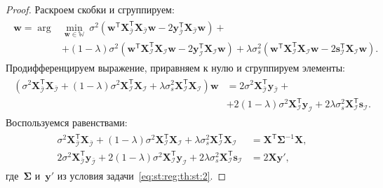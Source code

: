 \begin{proof}
Раскроем скобки и сгруппируем:
\begin{gather}
\label{eq:st:reg:3}
\begin{aligned}
\hat{\mathbf{w}} = \arg&\min_{\mathbf{w}\in \mathbb{W}} ~ \sigma^2\left(\mathbf{w}^{\mathsf{T}}\mathbf{X}^{\mathsf{T}}_{\bar{\mathcal{I}}}\mathbf{X}_{\bar{\mathcal{I}}}\mathbf{w} - 2\mathbf{y}^{\mathsf{T}}_{\bar{\mathcal{I}}}\mathbf{X}_{\bar{\mathcal{I}}}\mathbf{w}\right) +\\
&+ \left(1-\lambda\right)\sigma^2\left(\mathbf{w}^{\mathsf{T}}\mathbf{X}^{\mathsf{T}}_{\mathcal{I}}\mathbf{X}_{\mathcal{I}}\mathbf{w}- 2\mathbf{y}^{\mathsf{T}}_{\mathcal{I}}\mathbf{X}_{\mathcal{I}}\mathbf{w}\right) + \lambda\sigma^2_s\left(\mathbf{w}^{\mathsf{T}}\mathbf{X}^{\mathsf{T}}_{\mathcal{I}}\mathbf{X}_{\mathcal{I}}\mathbf{w}- 2\mathbf{s}^{\mathsf{T}}_{\mathcal{I}}\mathbf{X}_{\mathcal{I}}\mathbf{w}\right).
\end{aligned}
\end{gather}
Продифференцируем выражение, приравняем к нулю и сгруппируем элементы:
\begin{gather}
\label{eq:st:reg:4}
\begin{aligned}
\left(\sigma^{2}\mathbf{X}^{\mathsf{T}}_{\bar{\mathcal{I}}}\mathbf{X}_{\bar{\mathcal{I}}} + \left(1-\lambda\right)\sigma^2\mathbf{X}^{\mathsf{T}}_{\mathcal{I}}\mathbf{X}_{\mathcal{I}} + \lambda\sigma^{2}_s\mathbf{X}^{\mathsf{T}}_{\mathcal{I}}\mathbf{X}_{\mathcal{I}}\right) \mathbf{w}& = 2\sigma^2\mathbf{X}^{\mathsf{T}}_{\bar{\mathcal{I}}}\mathbf{y}_{\bar{\mathcal{I}}}+\\
&+ 2\left(1-\lambda\right)\sigma^2\mathbf{X}^{\mathsf{T}}_{\mathcal{I}}\mathbf{y}_{\mathcal{I}} + 2\lambda\sigma_s^2\mathbf{X}^{\mathsf{T}}_{\mathcal{I}}\mathbf{s}_{\mathcal{I}}.
\end{aligned}
\end{gather}
Воспользуемся равенствами:
\begin{gather}
\label{eq:st:reg:simp}
\begin{aligned}
\sigma^{2}\mathbf{X}^{\mathsf{T}}_{\bar{\mathcal{I}}}\mathbf{X}_{\bar{\mathcal{I}}} + \left(1-\lambda\right)\sigma^2\mathbf{X}^{\mathsf{T}}_{\mathcal{I}}\mathbf{X}_{\mathcal{I}} + \lambda\sigma^{2}_s\mathbf{X}^{\mathsf{T}}_{\mathcal{I}}\mathbf{X}_{\mathcal{I}} &= \mathbf{X}^{\mathsf{T}}\bm{\Sigma}^{-1}\mathbf{X},\\
2\sigma^2\mathbf{X}^{\mathsf{T}}_{\bar{\mathcal{I}}}\mathbf{y}_{\bar{\mathcal{I}}} + 2\left(1-\lambda\right)\sigma^2\mathbf{X}^{\mathsf{T}}_{\mathcal{I}}\mathbf{y}_{\mathcal{I}} + 2\lambda\sigma_s^2\mathbf{X}^{\mathsf{T}}_{\mathcal{I}}\mathbf{s}_{\mathcal{I}} &= 2\mathbf{X}\mathbf{y'},
\end{aligned}
\end{gather}
где~$\bm{\Sigma}$ и~$\mathbf{y'}$ из условия задачи~\eqref{eq:st:reg:th:st:2}.


\end{proof}
